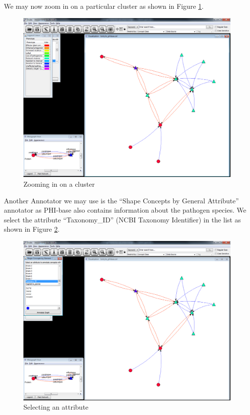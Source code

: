 We may now zoom in on a particular cluster as shown in Figure \ref{fig:bot_zoom_in}.

\begin{figure}[H]
\centering
\includegraphics[scale=0.35]{images/Oct12/app2fig5.png} 
\caption{Zooming in on a cluster}
\label{fig:bot_zoom_in}
\end{figure}

Another Annotator we may use is the ``Shape Concepts by General Attribute'' annotator as PHI-base also contains information about the pathogen species. 
We select the attribute ``Taxonomy\_ID'' (NCBI Taxonomy Identifier) in the list as shown in Figure \ref{fig:bot_taxid}.

\begin{figure}[H]
\centering
\includegraphics[scale=0.35]{images/Oct12/app2fig6.png} 
\caption{Selecting an attribute}
\label{fig:bot_taxid}
\end{figure}

